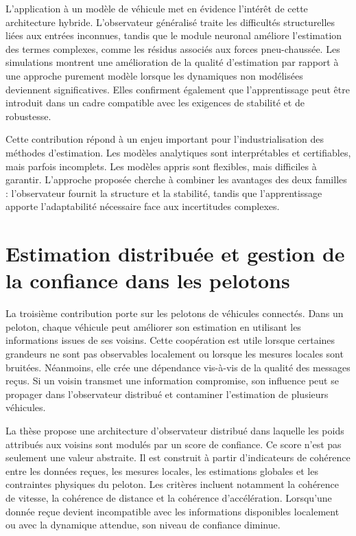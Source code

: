 L'application à un modèle de véhicule met en évidence l'intérêt de cette architecture hybride. L'observateur généralisé traite les difficultés structurelles liées aux entrées inconnues, tandis que le module neuronal améliore l'estimation des termes complexes, comme les résidus associés aux forces pneu-chaussée. Les simulations montrent une amélioration de la qualité d'estimation par rapport à une approche purement modèle lorsque les dynamiques non modélisées deviennent significatives. Elles confirment également que l'apprentissage peut être introduit dans un cadre compatible avec les exigences de stabilité et de robustesse.

Cette contribution répond à un enjeu important pour l'industrialisation des méthodes d'estimation. Les modèles analytiques sont interprétables et certifiables, mais parfois incomplets. Les modèles appris sont flexibles, mais difficiles à garantir. L'approche proposée cherche à combiner les avantages des deux familles : l'observateur fournit la structure et la stabilité, tandis que l'apprentissage apporte l'adaptabilité nécessaire face aux incertitudes complexes.

\section*{Estimation distribuée et gestion de la confiance dans les pelotons}

La troisième contribution porte sur les pelotons de véhicules connectés. Dans un peloton, chaque véhicule peut améliorer son estimation en utilisant les informations issues de ses voisins. Cette coopération est utile lorsque certaines grandeurs ne sont pas observables localement ou lorsque les mesures locales sont bruitées. Néanmoins, elle crée une dépendance vis-à-vis de la qualité des messages reçus. Si un voisin transmet une information compromise, son influence peut se propager dans l'observateur distribué et contaminer l'estimation de plusieurs véhicules.

La thèse propose une architecture d'observateur distribué dans laquelle les poids attribués aux voisins sont modulés par un score de confiance. Ce score n'est pas seulement une valeur abstraite. Il est construit à partir d'indicateurs de cohérence entre les données reçues, les mesures locales, les estimations globales et les contraintes physiques du peloton. Les critères incluent notamment la cohérence de vitesse, la cohérence de distance et la cohérence d'accélération. Lorsqu'une donnée reçue devient incompatible avec les informations disponibles localement ou avec la dynamique attendue, son niveau de confiance diminue.

